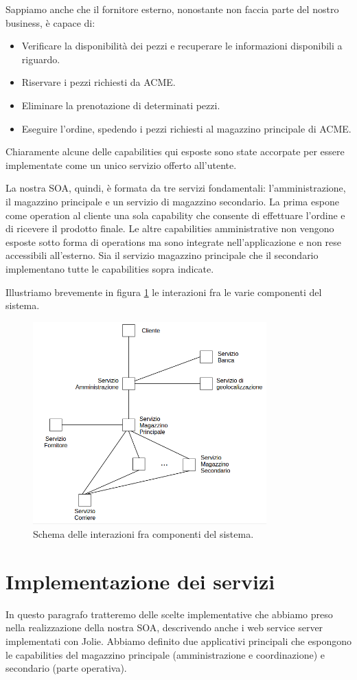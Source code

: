 \documentclass[twoside]{article}
\begin{document}
Sappiamo anche che il fornitore esterno, nonostante non faccia parte del nostro business,
è capace di:
\begin{itemize}
	\item Verificare la disponibilità dei pezzi e recuperare le informazioni disponibili a riguardo.
	\item Riservare i pezzi richiesti da ACME.
	\item Eliminare la prenotazione di determinati pezzi.
	\item Eseguire l'ordine, spedendo i pezzi richiesti al magazzino principale di ACME.
\end{itemize}
Chiaramente alcune delle capabilities qui esposte sono state accorpate per essere implementate
come un unico servizio offerto all'utente.

La nostra SOA, quindi, è formata da tre servizi fondamentali: l'amministrazione, il magazzino principale e un
servizio di magazzino secondario. La prima espone come operation al cliente una sola capability
che consente di effettuare l'ordine e di ricevere il prodotto finale.
Le altre capabilities amministrative non vengono esposte sotto forma di operations
ma sono integrate nell'applicazione e non rese accessibili all'esterno.
Sia il servizio magazzino principale che il secondario implementano tutte le capabilities sopra indicate.

Illustriamo brevemente in figura \ref{fig:4} le interazioni fra le varie componenti del sistema.

\begin{figure}[!tbp]
\centering
\includegraphics[width=9cm]{schema.png}
\caption{Schema delle interazioni fra componenti del sistema.}\label{fig:4}
\end{figure}

\section{Implementazione dei servizi}
In questo paragrafo tratteremo delle scelte implementative che abbiamo preso nella realizzazione
della nostra SOA, descrivendo anche i web service server implementati con Jolie.
Abbiamo definito due applicativi principali che espongono le capabilities del magazzino principale
(amministrazione e coordinazione) e secondario (parte operativa). 
\end{document}
